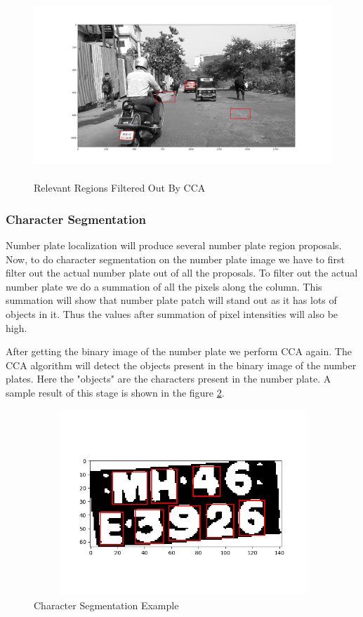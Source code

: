 \begin{figure}[!htb]
\centerline{\includegraphics[height=70mm,width=140mm]{img/rd8.png}}
\caption{Relevant Regions Filtered Out By CCA}
\label{fig8}
\end{figure}
 
 
\subsubsection{Character Segmentation}

Number plate localization will produce several number plate region proposals. Now, to do character segmentation on the number plate image we have to first filter out the actual number plate out of all the proposals. To filter out the actual number plate we do a summation of all the pixels along the column. This summation will show that number plate patch will stand out as it has lots of objects in it. Thus the values after summation of pixel intensities will also be high. 
\par After getting the binary image of the number plate we perform CCA again. The CCA algorithm will detect the objects present in the binary image of the number plates. Here the "objects" are the characters present in the number plate. A sample result of this stage is shown in the figure \ref{fig9}.

\begin{figure}[!htb]
\centerline{\includegraphics[height=70mm,width=140mm]{img/rd9.png}}
\caption{Character Segmentation Example}
\label{fig9}
\end{figure}
 
